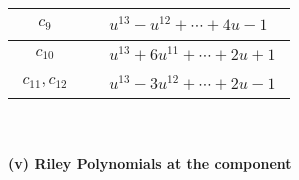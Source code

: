 \documentclass[1p]{elsarticle_modified}
\theoremstyle{definition}
\begin{document}
\begin{tabular}{m{50pt}|m{274pt}}
\hline $$\begin{aligned}c_{9}\end{aligned}$$&$\begin{aligned}
&u^{13}- u^{12}+\cdots+4 u-1
\end{aligned}$\\
\hline $$\begin{aligned}c_{10}\end{aligned}$$&$\begin{aligned}
&u^{13}+6 u^{11}+\cdots+2 u+1
\end{aligned}$\\
\hline $$\begin{aligned}c_{11},c_{12}\end{aligned}$$&$\begin{aligned}
&u^{13}-3 u^{12}+\cdots+2 u-1
\end{aligned}$\\
\hline
\end{tabular}\\~\\
\newpage\renewcommand{\arraystretch}{1}
\flushleft \textbf{(v) Riley Polynomials at the component}\newline \\
\end{document}
